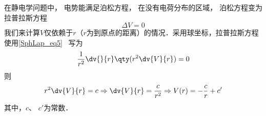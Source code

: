 \begin{example}{}
在静电学问题中， 电势能满足泊松方程， 在没有电荷分布的区域， 泊松方程变为拉普拉斯方程
\begin{equation}
\Delta V=0
\end{equation}
我们来计算$V$仅依赖于$r$（$r$为到原点的距离）的情况．采用球坐标，拉普拉斯方程使用\autoref{SphLap_eq5}~ 写为
\begin{equation}
\frac{1}{r^2}\dv{}{r}\qty(r^2\dv{V}{r})=0
\end{equation}
则
\begin{equation}
r^2\dv{V}{r}=c\Rightarrow \dv{V}{r}=\frac{c}{r^2}
\Rightarrow V(r)=-\frac{c}{r}+c'
\end{equation}
其中，$c$、 $c'$为常数．
\end{example}

